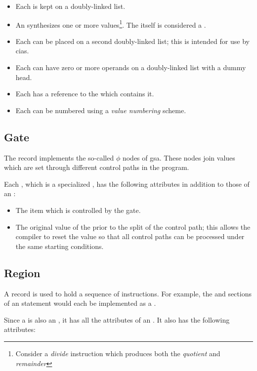 \begin{itemize}
\item Each is kept on a doubly-linked list.
\item An synthesizes one or more 
  values\footnote{Consider a \emph{divide} instruction which produces
    both the \emph{quotient} and \emph{remainder}}.  The
   itself is considered a .
\item Each can be placed on a second doubly-linked list; this is
  intended for use by \acp{cia}.
\item Each can have zero or more operands on a doubly-linked list with
  a dummy head.
\item Each has a reference to the  which contains it.
  \item Each can be numbered using a \emph{value numbering} scheme.
\end{itemize}

\subsection{Gate}
The  record implements the so-called $\phi$ nodes of
\ac{gsa}.  These nodes join values which are set through different
control paths in the program.

Each , which is a specialized , has the
following attributes in addition to those of an :

\begin{itemize}
\item The  item which is controlled by the gate.
\item The original value of the  prior to the split
  of the control path; this allows the compiler to reset the value so
  that all control paths can be processed under the same starting conditions.
\end{itemize}

\subsection{Region}

A  record is used to hold a sequence of instructions.
For example, the  and  sections of an 
statement would each be implemented as a .

Since a  is also an , it has all the
attributes of an .  It also has the following
attributes:

